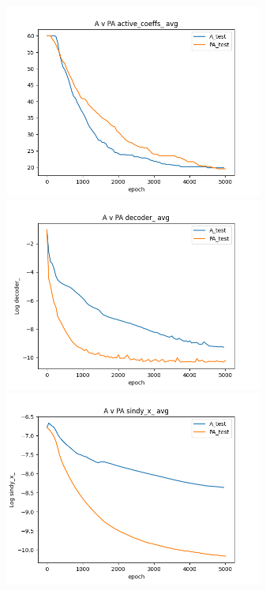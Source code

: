 \documentclass[11pt]{article}
\begin{document}
\includegraphics[width=85mm]{ri_coeffs.png}
\includegraphics[width=85mm]{ri_decoder.png}
\includegraphics[width=85mm]{ri_sindy_x.png}
\end{document}
